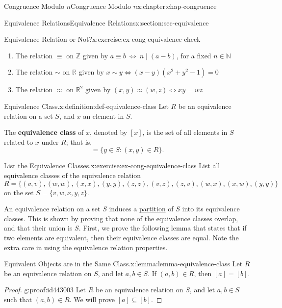 \documentclass[oneside,10pt,]{book}
\newcommand{\terminology}[1]{\textbf{#1}}
\numberwithin{equation}{section}
\begin{document}
\begin{chapterptx}{Congruence Modulo \(n\)}{}{Congruence Modulo \(n\)}{}{}{x:chapter:chap-congruence}
\begin{sectionptx}{Equivalence Relations}{}{Equivalence Relations}{}{}{x:section:sec-equivalence}
\begin{inlineexercise}{Equivalence Relation or Not?}{x:exercise:ex-cong-equivalence-check}
\begin{enumerate}[label=(\alph*)]
\item{}The relation \(\equiv\) on \(\mathbb{Z}\) given by \(a \equiv b \ \Leftrightarrow \ n \mid (a-b)\), for a fixed \(n \in \mathbb{N}\)%
\item{}The relation \(\sim\) on \(\mathbb{R}\) given by \(x \sim y \Leftrightarrow (x-y)(x^2+y^2-1) = 0\)%
\item{}The relation \(\approx\) on \(\mathbb{R}^2\) given by \((x,y) \approx (w,z) \Leftrightarrow xy = wz\)%
\end{enumerate}
%
\end{inlineexercise}
\begin{definition}{Equivalence Class.}{x:definition:def-equivalence-class}%
\label{g:notation:id442445}%
Let \(R\) be an equivalence relation on a set \(S\), and \(x\) an element in \(S\).%
\par
The \terminology{equivalence class} of \(x\), denoted by \([x]\), is the set of all elements in \(S\) related to \(x\) under \(R\); that is,%
\begin{equation*}
[x] = \{y \in S : (x,y) \in R\}\text{.}
\end{equation*}
%
\end{definition}
\begin{inlineexercise}{List the Equivalence Classes.}{x:exercise:ex-cong-equivalence-class}%
List all equivalence classes of the equivalence relation%
\begin{equation*}
R = \{(v,v),(w,w),(x,x),(y,y),(z,z),(v,z),(z,v),(w,x),(x,w),(y,y)\}
\end{equation*}
on the set \(S = \{v,w,x,y,z\}\).%
\end{inlineexercise}
An equivalence relation on a set \(S\) induces a \hyperref[x:definition:def-partition]{partition} of \(S\) into its equivalence classes. This is shown by proving that none of the equivalence classes overlap, and that their union is \(S\). First, we prove the following lemma that states that if two elements are equivalent, then their equivalence classes are equal. Note the extra care in using the equivalence relation properties.%
\begin{lemma}{Equivalent Objects are in the Same Class.}{}{x:lemma:lemma-equivalence-class}%
Let \(R\) be an equivalence relation on \(S\), and let \(a, b \in S\). If \((a,b) \in R\), then \([a] = [b]\).%
\end{lemma}
\begin{proof}{}{g:proof:id443003}
Let \(R\) be an equivalence relation on \(S\), and let \(a, b \in S\) such that \((a,b) \in R\). We will prove \([a] \subseteq [b]\).%

\end{proof}
\end{sectionptx}
\end{chapterptx}
\end{document}
